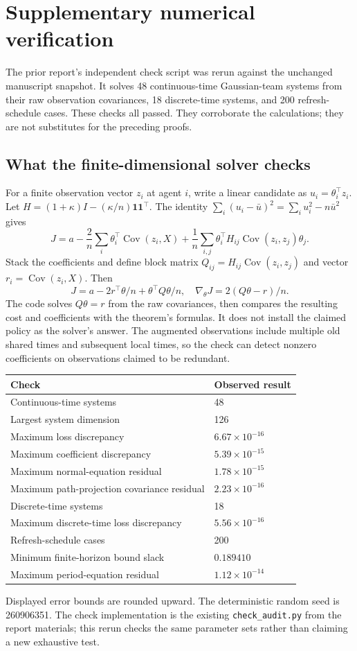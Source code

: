\documentclass[12pt,letterpaper]{article}
\newcommand{\Cov}{\operatorname{Cov}}
\newcommand{\one}{\mathbf1}
\begin{document}
\section{Supplementary numerical verification}
The prior report's independent check script was rerun against the unchanged manuscript snapshot. It solves 48 continuous-time Gaussian-team systems from their raw observation covariances, 18 discrete-time systems, and 200 refresh-schedule cases. These checks all passed. They corroborate the calculations; they are not substitutes for the preceding proofs.

\subsection{What the finite-dimensional solver checks}
For a finite observation vector $z_i$ at agent $i$, write a linear candidate as $u_i=\theta_i^\top z_i$. Let $H=(1+\kappa)I-(\kappa/n)\one\one^\top$. The identity $\sum_i(u_i-\bar u)^2=\sum_i u_i^2-n\bar u^2$ gives
\[
J=a-\frac2n\sum_i\theta_i^\top\Cov(z_i,X)
+\frac1n\sum_{i,j}\theta_i^\top H_{ij}\Cov(z_i,z_j)\theta_j.
\]
Stack the coefficients and define block matrix $Q_{ij}=H_{ij}\Cov(z_i,z_j)$ and vector $r_i=\Cov(z_i,X)$. Then
\[
J=a-2r^\top\theta/n+\theta^\top Q\theta/n,
\quad \nabla_\theta J=2(Q\theta-r)/n.
\]
The code solves $Q\theta=r$ from the raw covariances, then compares the resulting cost and coefficients with the theorem's formulas. It does not install the claimed policy as the solver's answer. The augmented observations include multiple old shared times and subsequent local times, so the check can detect nonzero coefficients on observations claimed to be redundant.

\begin{longtable}{p{.68\linewidth}p{.22\linewidth}}
\toprule Check & Observed result \\
\midrule\endhead
Continuous-time systems & 48 \\
Largest system dimension & 126 \\
Maximum loss discrepancy & $6.67\times10^{-16}$ \\
Maximum coefficient discrepancy & $5.39\times10^{-15}$ \\
Maximum normal-equation residual & $1.78\times10^{-15}$ \\
Maximum path-projection covariance residual & $2.23\times10^{-16}$ \\
Discrete-time systems & 18 \\
Maximum discrete-time loss discrepancy & $5.56\times10^{-16}$ \\
Refresh-schedule cases & 200 \\
Minimum finite-horizon bound slack & $0.189410$ \\
Maximum period-equation residual & $1.12\times10^{-14}$ \\
\bottomrule\end{longtable}
Displayed error bounds are rounded upward. The deterministic random seed is 260906351. The check implementation is the existing \texttt{check\_audit.py} from the report materials; this rerun checks the same parameter sets rather than claiming a new exhaustive test.
\end{document}

